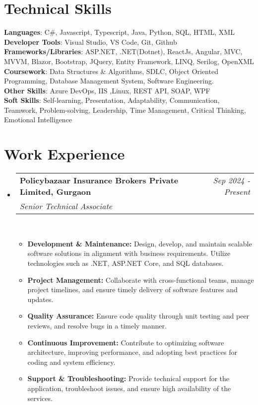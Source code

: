 \documentclass[a4paper,12pt]{article}
\makeatletter
\newcommand{\resumeSubHeadingListStart}{\begin{itemize}[leftmargin=*,labelsep=1mm,noitemsep]}
\newcommand{\resumeSubHeadingListEnd}{\end{itemize}\vspace{2mm}}
\newcommand{\resumeItemListStart}{\begin{itemize}[leftmargin=3ex, rightmargin=2ex, noitemsep,labelsep=1.2mm,itemsep=0mm]\small}
\newcommand{\resumeItemListEnd}{\end{itemize}\vspace{-2mm}}
\newcommand{\resumeExperience}[4]{
\vspace{0.5mm}\item
    \begin{tabular*}{0.98\textwidth}[t]{l@{\extracolsep{\fill}}r}
        \textbf{#1} & \textit{\footnotesize{#3}}\\
        \textit{\footnotesize{#2}} & {}
    \end{tabular*}\\ [1mm]
    \footnotesize{#4}
}
\makeatother
\begin{document}
\section{\textbf{Technical Skills}}
 \begin{itemize}[leftmargin=0.1in, label={}]
    \small{\item{
     \textbf{Languages}{: C\#, Javascript, Typescript, Java, Python, SQL, HTML, XML} \\
     \textbf{Developer Tools}{: Visual Studio, VS Code, Git, Github } \\
     \textbf{Frameworks/Libraries}{: ASP.NET, .NET(Dotnet), ReactJs, Angular, MVC, MVVM, Blazor, Bootstrap, JQuery, Entity Framework, LINQ, Serilog, OpenXML } \\
     \textbf{Coursework}{: Data Structures \& Algorithms, SDLC, Object Oriented Programming, Database Management System, Software Engineering.} \\
     \textbf{Other Skills}{: Azure DevOps, IIS ,Linux, REST API, SOAP, WPF} \\
     \textbf{Soft Skills}{: Self-learning, Presentation, Adaptability, Communication, Teamwork, Problem-solving, Leadership, Time Management, Critical Thinking, Emotional Intelligence} \\
    }}
 \end{itemize}

\section{Work Experience}

\resumeSubHeadingListStart
\resumeExperience {Policybazaar Insurance Brokers Private Limited, Gurgaon}
 {Senior Technical Associate} {Sep 2024 - Present}
 {}
\resumeItemListStart
    \item \textbf{Development \& Maintenance:} Design, develop, and maintain scalable software solutions in alignment with business requirements. Utilize technologies such as .NET, ASP.NET Core, and SQL databases.
    \item \textbf{Project Management:} Collaborate with cross-functional teams, manage project timelines, and ensure timely delivery of software features and updates.
    \item \textbf{Quality Assurance:} Ensure code quality through unit testing and peer reviews, and resolve bugs in a timely manner.
    \item \textbf{Continuous Improvement:} Contribute to optimizing software architecture, improving performance, and adopting best practices for coding and system efficiency.
    \item \textbf{Support \& Troubleshooting:} Provide technical support for the application, troubleshoot issues, and ensure high availability of the services.
    \resumeItemListEnd
\resumeSubHeadingListEnd
\end{document}
